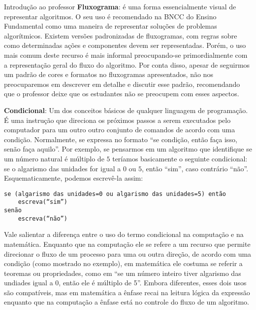 \begin{apresentacao}{Introdução ao professor}
\textbf{Fluxograma}: é uma forma essencialmente visual de representar algoritmos. O seu uso é recomendado na BNCC do Ensino Fundamental como uma maneira de representar soluções de problemas algorítmicos. Existem versões padronizadas de fluxogramas, com regras sobre como determinadas ações e componentes devem ser representadas. Porém, o uso mais comum deste recurso é mais informal preocupando-se primordialmente com a representação geral do fluxo do algoritmo. Por conta disso, apesar de seguirmos um padrão de cores e formatos no fluxogramas apresentados, não nos preocuparemos em descrever em detalhe e discutir esse padrão, recomendando que o professor deixe que os estudantes não se preocupem com esses aspectos.

\textbf{Condicional}: Um dos conceitos básicos de qualquer linguagem de programação. É uma instrução que direciona os próximos passos a serem executados pelo computador para um outro outro conjunto de comandos de acordo com uma condição. Normalmente, se expressa no formato “se condição, então faça isso, senão faça aquilo”. Por exemplo, se pensarmos em um algoritmo que identifique se um número natural é múltiplo de $5$ teríamos basicamente o seguinte condicional: se o algarismo das unidades for igual a $0$ ou $5$, então “sim”, caso contrário “não”. Esquematicamente, podemos escrevê-la assim:
\begin{verbatim}
se (algarismo das unidades=0 ou algarismo das unidades=5) então
    escreva(“sim”)
senão
    escreva(“não”)
\end{verbatim}

Vale salientar a diferença entre o uso do termo condicional na computação e na matemática. Enquanto que na computação ele se refere a um recurso que permite direcionar o fluxo de um processo para uma ou outra direção, de acordo com uma condição (como mostrado no exemplo), em matemática ele costuma se referir a teoremas ou propriedades, como em “se um número inteiro tiver algarismo das undiades igual a $0$, então ele é múltiplo de 5”. Embora diferentes, esses dois usos são compatíveis, mas em matemática a ênfase recai na leitura lógica da expressão enquanto que na computação a ênfase está no controle do fluxo de um algoritmo.


\end{apresentacao}
